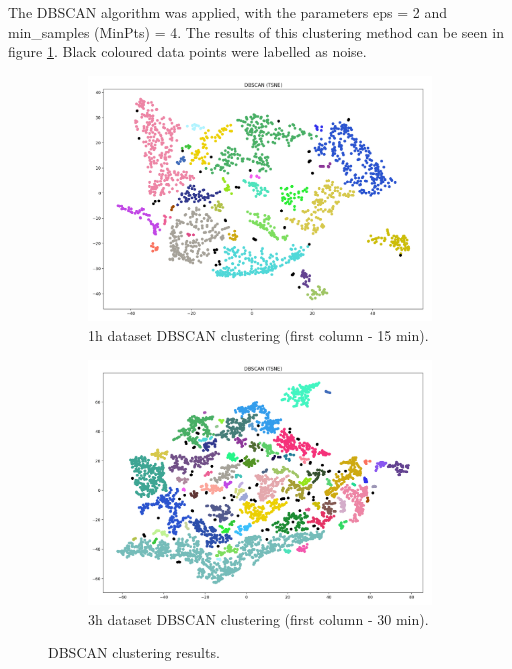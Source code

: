 The DBSCAN algorithm was applied, with the parameters eps = 2 and min\_samples (MinPts) = 4. The results of this clustering method can be seen in figure \ref{figure:DBSCANResults}. Black coloured data points were labelled as noise.


\begin{figure}[H]
  \centering
  \begin{subfigure}{.5\textwidth}\captionsetup{width=.8\linewidth}
    \centering
    \includegraphics[width=1\textwidth]{./images/clusteringResults/1h-1-DBSCAN.png}
  \caption{1h dataset DBSCAN clustering (first column - 15 min).}
  \end{subfigure}%
  \hfill
  \begin{subfigure}{.5\textwidth}\captionsetup{width=.8\linewidth}
    \centering
    \includegraphics[width=1\textwidth]{./images/clusteringResults/3h-1-DBSCAN.png}
    \caption{3h dataset DBSCAN clustering (first column - 30 min).}
  \end{subfigure}
  \caption{DBSCAN clustering results.}
  \label{figure:DBSCANResults}
  \end{figure}


